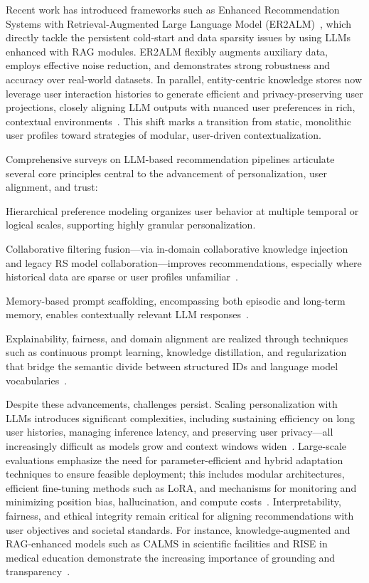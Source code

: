 \documentclass[sigconf]{acmart}
\begin{document}
Recent work has introduced frameworks such as Enhanced Recommendation Systems with Retrieval-Augmented Large Language Model (ER2ALM)~\cite{ref11,ref36}, which directly tackle the persistent cold-start and data sparsity issues by using LLMs enhanced with RAG modules. ER2ALM flexibly augments auxiliary data, employs effective noise reduction, and demonstrates strong robustness and accuracy over real-world datasets. In parallel, entity-centric knowledge stores now leverage user interaction histories to generate efficient and privacy-preserving user projections, closely aligning LLM outputs with nuanced user preferences in rich, contextual environments~\cite{ref36,ref39}. This shift marks a transition from static, monolithic user profiles toward strategies of modular, user-driven contextualization.

Comprehensive surveys on LLM-based recommendation pipelines articulate several core principles central to the advancement of personalization, user alignment, and trust:

Hierarchical preference modeling organizes user behavior at multiple temporal or logical scales, supporting highly granular personalization.

Collaborative filtering fusion—via in-domain collaborative knowledge injection and legacy RS model collaboration—improves recommendations, especially where historical data are sparse or user profiles unfamiliar~\cite{ref33}.

Memory-based prompt scaffolding, encompassing both episodic and long-term memory, enables contextually relevant LLM responses~\cite{ref23,ref32,ref36}.

Explainability, fairness, and domain alignment are realized through techniques such as continuous prompt learning, knowledge distillation, and regularization that bridge the semantic divide between structured IDs and language model vocabularies~\cite{ref32,ref33,ref34}.

Despite these advancements, challenges persist. Scaling personalization with LLMs introduces significant complexities, including sustaining efficiency on long user histories, managing inference latency, and preserving user privacy—all increasingly difficult as models grow and context windows widen~\cite{ref5,ref24,ref32,ref33,ref55}. Large-scale evaluations emphasize the need for parameter-efficient and hybrid adaptation techniques to ensure feasible deployment; this includes modular architectures, efficient fine-tuning methods such as LoRA, and mechanisms for monitoring and minimizing position bias, hallucination, and compute costs~\cite{ref32,ref33}. Interpretability, fairness, and ethical integrity remain critical for aligning recommendations with user objectives and societal standards. For instance, knowledge-augmented and RAG-enhanced models such as CALMS in scientific facilities and RISE in medical education demonstrate the increasing importance of grounding and transparency~\cite{ref30,ref55}.
\end{document}
